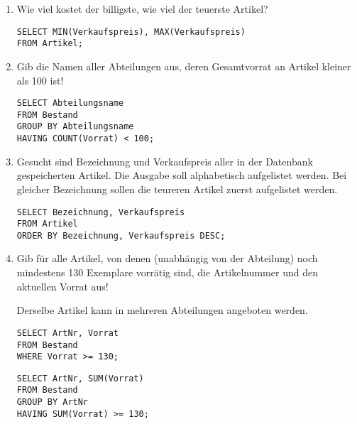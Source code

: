 \documentclass{lehramt-informatik-aufgabe}
\begin{document}
\begin{enumerate}

\item Wie viel kostet der billigste, wie viel der teuerste Artikel?

\begin{antwort}[muster]
\begin{verbatim}
SELECT MIN(Verkaufspreis), MAX(Verkaufspreis)
FROM Artikel;
\end{verbatim}
\end{antwort}


\item Gib die Namen aller Abteilungen aus, deren Gesamtvorrat an Artikel
kleiner als 100 ist!

\begin{antwort}[muster]
\begin{verbatim}
SELECT Abteilungsname
FROM Bestand
GROUP BY Abteilungsname
HAVING COUNT(Vorrat) < 100;
\end{verbatim}
\end{antwort}


\item Gesucht sind Bezeichnung und Verkaufspreis aller in der Datenbank
gespeicherten Artikel. Die Ausgabe soll alphabetisch aufgelistet werden.
Bei gleicher Bezeichnung sollen die teureren Artikel zuerst aufgelistet
werden.

\begin{antwort}[muster]
\begin{verbatim}
SELECT Bezeichnung, Verkaufspreis
FROM Artikel
ORDER BY Bezeichnung, Verkaufspreis DESC;
\end{verbatim}
\end{antwort}


\item Gib für alle Artikel, von denen (unabhängig von der Abteilung)
noch mindestens 130 Exemplare vorrätig sind, die Artikelnummer und den
aktuellen Vorrat aus!

\begin{antwort}[falsch]
Derselbe Artikel kann in mehreren Abteilungen angeboten werden.
\begin{verbatim}
SELECT ArtNr, Vorrat
FROM Bestand
WHERE Vorrat >= 130;
\end{verbatim}
\end{antwort}

\begin{antwort}[muster]
\begin{verbatim}
SELECT ArtNr, SUM(Vorrat)
FROM Bestand
GROUP BY ArtNr
HAVING SUM(Vorrat) >= 130;
\end{verbatim}
\end{antwort}
\end{enumerate}
\end{document}
